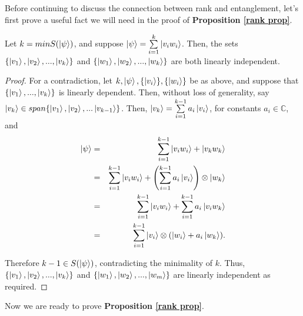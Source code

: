 Before continuing to discuss the connection between rank and entanglement, let's first prove a useful fact we will need in the proof of \textbf{Proposition \ref{rank prop}}.

\begin{lemma}
\label{independence lemma}
Let $k=min S(\ket{\psi})$, and suppose $\ket{\psi}=\sum\limits_{i=1}^k \ket{v_iw_i}$.  Then, the sets $\{\ket{v_1}, \ket{v_2},...,\ket{v_k}\}$ and $\{\ket{w_1}, \ket{w_2},...,\ket{w_k}\}$ are both linearly independent.
\end{lemma}

\begin{proof}
For a contradiction, let $k, \ket{\psi}, \{\ket{v_i}\}, \{\ket{w_i}\}$ be as above, and suppose that $\{\ket{v_1}, ...,\ket{v_k}\}$ is linearly dependent. Then, without loss of generality, say $\ket{v_k} \in span\{\ket{v_1}, \ket{v_2},...\ket{v_{k-1}}\}$. Then, $\ket{v_k}=\sum\limits_{i=1}^{k-1} a_i \ket{v_i}$, for constants $a_i \in \mathbb{C}$, and
\begin{eqnarray*}
\ket{\psi}&=&\sum\limits_{i=1}^{k-1} \ket{v_i w_i} + \ket{v_k w_k}\\
&=&\sum_{i=1}^{k-1} \ket{v_i w_i} + \left(\sum_{i=1}^{k-1} a_i\ket{v_i}\right) \otimes \ket{w_k}\\
&=&\sum_{i=1}^{k-1} \ket{v_i w_i} + \sum_{i=1}^{k-1} a_i\ket{v_iw_k}\\
&=&\sum_{i=1}^{k-1} \ket{v_i} \otimes (\ket{w_i}+a_i\ket{w_k}).\\
\end{eqnarray*}

Therefore $k-1 \in S(\ket{\psi})$, contradicting the minimality of $k$.  Thus, $\{\ket{v_1}, \ket{v_2},...,\ket{v_k}\}$ and $\{\ket{w_1}, \ket{w_2},...,\ket{w_m}\}$ are linearly independent as required.
\end{proof}

\bigskip
Now we are ready to prove \textbf{Proposition \ref{rank prop}}.

